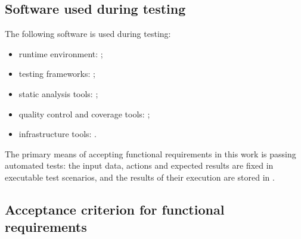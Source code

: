 \documentclass[12pt,a4paper]{extarticle}
\begin{document}
\subsection{Software used during testing}

\begin{hseExample}
The following software is used during testing:

\begin{itemize}[leftmargin=1.25cm]
    \item runtime environment: ;
    \item testing frameworks: ;
    \item static analysis tools: ;
    \item quality control and coverage tools: ;
    \item infrastructure tools: .
\end{itemize}

The primary means of accepting functional requirements in this work is passing automated tests: the input data, actions and expected results are fixed in executable test scenarios, and the results of their execution are stored in .
\end{hseExample}

\subsection{Acceptance criterion for functional requirements}
\end{document}
